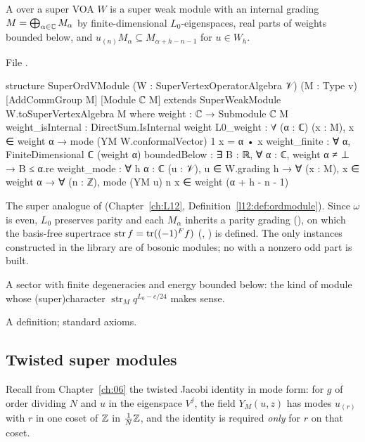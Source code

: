 \begin{definition}\label{l17:def:superord}
A  over a super VOA $W$ is a super weak module with an internal grading
$M=\bigoplus_{\alpha\in{\mathbb{C}}}M_\alpha$ by finite-dimensional $L_0$-eigenspaces, real parts of weights
bounded below, and $u_{(n)}M_\alpha\subseteq M_{\alpha+h-n-1}$ for $u\in W_h$.
\end{definition}
\noindent File .
\begin{leancode}
structure SuperOrdVModule (W : SuperVertexOperatorAlgebra 𝒱) (M : Type v)
    [AddCommGroup M] [Module ℂ M]
    extends SuperWeakModule W.toSuperVertexAlgebra M where
  weight : ℂ → Submodule ℂ M
  weight_isInternal : DirectSum.IsInternal weight
  L0_weight : ∀ (α : ℂ) (x : M), x ∈ weight α →
    mode (YM W.conformalVector) 1 x = α • x
  weight_finite : ∀ α, FiniteDimensional ℂ (weight α)
  boundedBelow : ∃ B : ℝ, ∀ α : ℂ, weight α ≠ ⊥ → B ≤ α.re
  weight_mode : ∀ {h α : ℂ} (u : 𝒱), u ∈ W.grading h →
    ∀ (x : M), x ∈ weight α → ∀ (n : ℤ),
      mode (YM u) n x ∈ weight (α + h - n - 1)
\end{leancode}
\begin{dictionary}
The super analogue of  (Chapter~\ref{ch:L12}, Definition~\ref{l12:def:ordmodule}).
Since $\omega$ is even, $L_0$ preserves parity and each $M_\alpha$ inherits a parity grading
(), on which the basis-free supertrace
$\operatorname{str}f=\operatorname{tr}((-1)^Ff)$ (, )
is defined. The only instances constructed in the library are  of bosonic
modules; no  with a nonzero odd part is built.
\end{dictionary}
\begin{physics}
A sector with finite degeneracies and energy bounded below: the kind of module whose (super)character
$\operatorname{str}_Mq^{L_0-c/24}$ makes sense.
\end{physics}
\begin{status}
A definition; standard axioms.
\end{status}

\subsection{Twisted super modules}

Recall from Chapter~\ref{ch:06} the twisted Jacobi identity in mode form: for $g$ of order dividing
$N$ and $u$ in the eigenspace $V^j$, the field $Y_M(u,z)$ has modes $u_{(r)}$ with $r$ in one coset of
${\mathbb{Z}}$ in $\frac1N{\mathbb{Z}}$, and the identity is required \emph{only} for $r$ on that coset.

